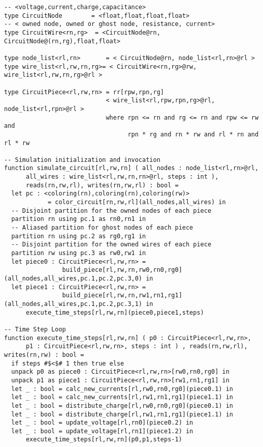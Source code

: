 \begin{lstlisting}[float={t},label={lst:circuit_ex},caption={Circuilt Simulation}]
-- <voltage,current,charge,capacitance>
type CircuitNode        = <float,float,float,float>
-- < owned node, owned or ghost node, resistance, current>
type CircuitWire<rn,rg>  = <CircuitNode@rn, CircuitNode@(rn,rg),float,float>

type node_list<rl,rn>       = < CircuitNode@rn, node_list<rl,rn>@rl >
type wire_list<rl,rw,rn,rg>= < CircuitWire<rn,rg>@rw, wire_list<rl,rw,rn,rg>@rl >

type CircuitPiece<rl,rw,rn> = rr[rpw,rpn,rg]
                            < wire_list<rl,rpw,rpn,rg>@rl, node_list<rl,rpn>@rl >         
                            where rpn <= rn and rg <= rn and rpw <= rw and
                                  rpn * rg and rn * rw and rl * rn and rl * rw

-- Simulation initialization and invocation
function simulate_circuit[rl,rw,rn] ( all_nodes : node_list<rl,rn>@rl, 
      all_wires : wire_list<rl,rw,rn,rn>@rl, steps : int ), 
      reads(rn,rw,rl), writes(rn,rw,rl) : bool = 
  let pc : <coloring(rn),coloring(rn),coloring(rw)> 
            = color_circuit[rn,rw,rl](all_nodes,all_wires) in
  -- Disjoint partition for the owned nodes of each piece
  partition rn using pc.1 as rn0,rn1 in
  -- Aliased partition for ghost nodes of each piece
  partition rn using pc.2 as rg0,rg1 in
  -- Disjoint partition for the owned wires of each piece
  partition rw using pc.3 as rw0,rw1 in
  let piece0 : CircuitPiece<rl,rw,rn> = 
                build_piece[rl,rw,rn,rw0,rn0,rg0](all_nodes,all_wires,pc.1,pc.2,pc.3,0) in
  let piece1 : CircuitPiece<rl,rw,rn> = 
                build_piece[rl,rw,rn,rw1,rn1,rg1](all_nodes,all_wires,pc.1,pc.2,pc.3,1) in
      execute_time_steps[rl,rw,rn](piece0,piece1,steps)

-- Time Step Loop
function execute_time_steps[rl,rw,rn] ( p0 : CircuitPiece<rl,rw,rn>, 
      p1 : CircuitPiece<rl,rw,rn>, steps : int ) , reads(rn,rw,rl), writes(rn,rw) : bool = 
  if steps #$<$# 1 then true else
  unpack p0 as piece0 : CircuitPiece<rl,rw,rn>[rw0,rn0,rg0] in 
  unpack p1 as piece1 : CircuitPiece<rl,rw,rn>[rw1,rn1,rg1] in
  let _ : bool = calc_new_currents[rl,rw0,rn0,rg0](piece0.1) in
  let _ : bool = calc_new_currents[rl,rw1,rn1,rg1](piece1.1) in
  let _ : bool = distribute_charge[rl,rw0,rn0,rg0](piece0.1) in
  let _ : bool = distribute_charge[rl,rw1,rn1,rg1](piece1.1) in
  let _ : bool = update_voltage[rl,rn0](piece0.2) in
  let _ : bool = update_voltage[rl,rn1](piece1.2) in
      execute_time_steps[rl,rw,rn](p0,p1,steps-1)


\end{lstlisting}
